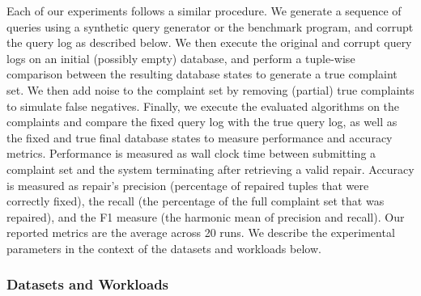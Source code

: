 Each of our experiments follows a similar procedure. 
We generate a sequence of queries using a synthetic query generator or 
the benchmark program, and corrupt the query log as described below. 
We then execute the original and corrupt query logs on an initial (possibly empty) database,
and perform a tuple-wise comparison between the resulting database states 
to generate a true complaint set.  
We then add noise to the complaint set by removing (partial) true complaints to simulate false negatives.
Finally, we execute the evaluated algorithms on the complaints and compare the fixed
query log with the true query log, as well as the fixed and true
final database states to measure performance and accuracy metrics.
Performance is measured as wall clock
time between submitting a complaint set and the system terminating after retrieving a valid repair.  
Accuracy is measured as repair's precision (percentage of repaired tuples that were correctly fixed), 
the recall (the percentage of the full complaint set that was repaired), 
and the F1 measure (the harmonic mean of precision and recall).
Our reported metrics are the average across 20 runs.
We describe the experimental parameters in the context of the datasets and workloads below.


\subsubsection{Datasets and Workloads}



